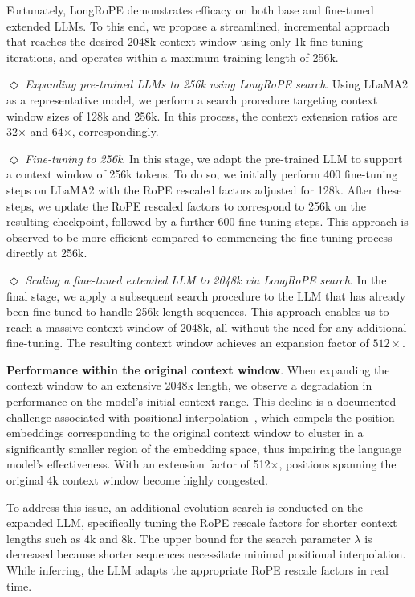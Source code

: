 Fortunately, LongRoPE demonstrates efficacy on both base and fine-tuned extended LLMs. To this end, we propose a streamlined, incremental approach that reaches the desired 2048k context window using only 1k fine-tuning iterations, and operates within a maximum training length of 256k.

$\Diamond$ \textit{Expanding pre-trained LLMs to 256k using LongRoPE search}. Using LLaMA2 as a representative model, we perform a search procedure targeting context window sizes of 128k and 256k. In this process, the context extension ratios are 32$\times$ and 64$\times$, correspondingly.

$\Diamond$ \textit{Fine-tuning to 256k}. In this stage, we adapt the pre-trained LLM to support a context window of 256k tokens. To do so, we initially perform 400 fine-tuning steps on LLaMA2 with the RoPE rescaled factors adjusted for 128k. After these steps, we update the RoPE rescaled factors to correspond to 256k on the resulting checkpoint, followed by a further 600 fine-tuning steps. This approach is observed to be more efficient compared to commencing the fine-tuning process directly at 256k.

$\Diamond$ \textit{Scaling a fine-tuned extended LLM to 2048k via LongRoPE search}. In the final stage, we apply a subsequent search procedure to the LLM that has already been fine-tuned to handle 256k-length sequences. This approach enables us to reach a massive context window of 2048k, all without the need for any additional fine-tuning. The resulting context window achieves an expansion factor of $512\times$.

\textbf{Performance within the original context window}. When expanding the context window to an extensive 2048k length, we observe a degradation in performance on the model’s initial context range. This decline is a documented challenge associated with positional interpolation~\cite{pi}, which compels the position embeddings corresponding to the original context window to cluster in a significantly smaller region of the embedding space, thus impairing the language model’s effectiveness. With an extension factor of 512$\times$, positions spanning the original 4k context window become highly congested.

To address this issue, an additional evolution search is conducted on the expanded LLM, specifically tuning the RoPE rescale factors for shorter context lengths such as 4k and 8k. The upper bound for the search parameter $\lambda$ is decreased because shorter sequences necessitate minimal positional interpolation. While inferring, the LLM adapts the appropriate RoPE rescale factors in real time.

